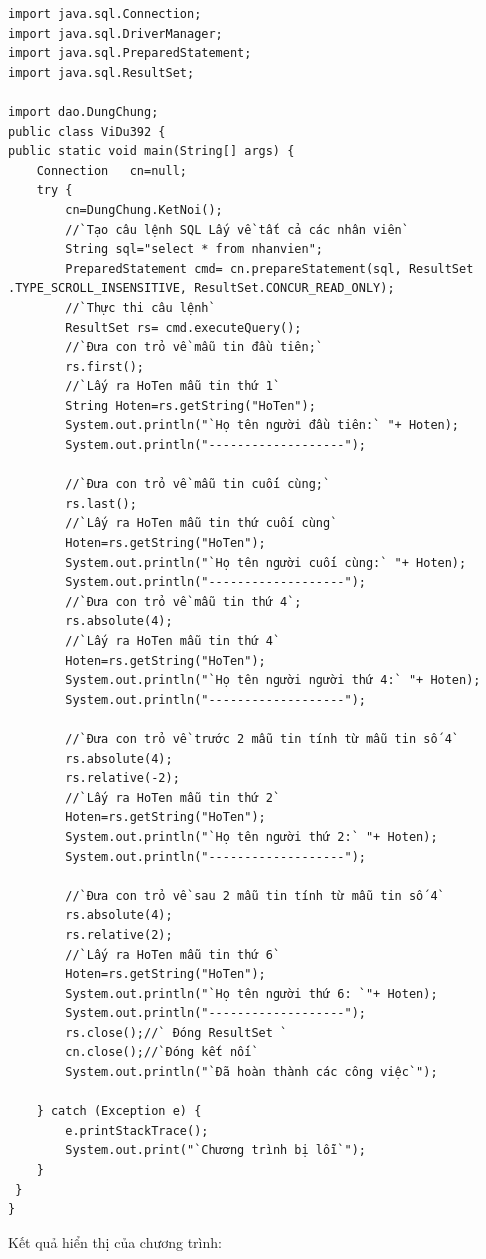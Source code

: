 \begin{lstlisting}[escapechar=`]
import java.sql.Connection;
import java.sql.DriverManager;
import java.sql.PreparedStatement;
import java.sql.ResultSet;

import dao.DungChung;
public class ViDu392 {
public static void main(String[] args) {
	Connection   cn=null;
	try { 
		cn=DungChung.KetNoi();
		//`Tạo câu lệnh SQL Lấy về tất cả các nhân viên`
		String sql="select * from nhanvien";
		PreparedStatement cmd= cn.prepareStatement(sql, ResultSet .TYPE_SCROLL_INSENSITIVE, ResultSet.CONCUR_READ_ONLY);
		//`Thực thi câu lệnh`
		ResultSet rs= cmd.executeQuery();
		//`Đưa con trỏ về mẫu tin đầu tiên;`
		rs.first();
		//`Lấy ra HoTen mẫu tin thứ 1`
		String Hoten=rs.getString("HoTen");
		System.out.println("`Họ tên người đầu tiên:` "+ Hoten);
		System.out.println("-------------------");
		
		//`Đưa con trỏ về mẫu tin cuối cùng;`
		rs.last();
		//`Lấy ra HoTen mẫu tin thứ cuối cùng`
		Hoten=rs.getString("HoTen");
		System.out.println("`Họ tên người cuối cùng:` "+ Hoten);
		System.out.println("-------------------");
		//`Đưa con trỏ về mẫu tin thứ 4`;
		rs.absolute(4);
		//`Lấy ra HoTen mẫu tin thứ 4`
		Hoten=rs.getString("HoTen");
		System.out.println("`Họ tên người người thứ 4:` "+ Hoten);
		System.out.println("-------------------");
		
		//`Đưa con trỏ về trước 2 mẫu tin tính từ mẫu tin số 4`
		rs.absolute(4);
		rs.relative(-2);
		//`Lấy ra HoTen mẫu tin thứ 2`
		Hoten=rs.getString("HoTen");
		System.out.println("`Họ tên người thứ 2:` "+ Hoten);
		System.out.println("-------------------");
		
		//`Đưa con trỏ về sau 2 mẫu tin tính từ mẫu tin số 4`
		rs.absolute(4);
		rs.relative(2);
		//`Lấy ra HoTen mẫu tin thứ 6`
		Hoten=rs.getString("HoTen");
		System.out.println("`Họ tên người thứ 6: `"+ Hoten);
		System.out.println("-------------------");
		rs.close();//` Đóng ResultSet `
		cn.close();//`Đóng kết nối`
		System.out.println("`Đã hoàn thành các công việc`");
	
	} catch (Exception e) {
		e.printStackTrace();
		System.out.print("`Chương trình bị lỗi`");
	}
 }
}

\end{lstlisting}
Kết quả hiển thị của chương trình:

